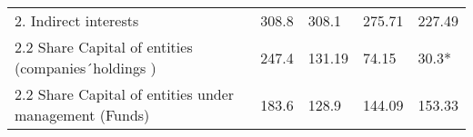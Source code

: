 \documentclass[]{book}
\theoremstyle{definition}
\theoremstyle{definition}
\theoremstyle{definition}
\theoremstyle{remark}
\begin{document}
\begin{longtable}[]{@{}lllll@{}}
\begin{minipage}[t]{0.17\columnwidth}\raggedright\strut
2. Indirect interests\strut
\end{minipage} & \begin{minipage}[t]{0.17\columnwidth}\raggedright\strut
308.8\strut
\end{minipage} & \begin{minipage}[t]{0.17\columnwidth}\raggedright\strut
308.1\strut
\end{minipage} & \begin{minipage}[t]{0.17\columnwidth}\raggedright\strut
275.71\strut
\end{minipage} & \begin{minipage}[t]{0.17\columnwidth}\raggedright\strut
227.49\strut
\end{minipage}\tabularnewline
\begin{minipage}[t]{0.17\columnwidth}\raggedright\strut
2.2 Share Capital of entities (companies´holdings )\strut
\end{minipage} & \begin{minipage}[t]{0.17\columnwidth}\raggedright\strut
247.4\strut
\end{minipage} & \begin{minipage}[t]{0.17\columnwidth}\raggedright\strut
131.19\strut
\end{minipage} & \begin{minipage}[t]{0.17\columnwidth}\raggedright\strut
74.15\strut
\end{minipage} & \begin{minipage}[t]{0.17\columnwidth}\raggedright\strut
30.3*\strut
\end{minipage}\tabularnewline
\begin{minipage}[t]{0.17\columnwidth}\raggedright\strut
2.2 Share Capital of entities under management (Funds)\strut
\end{minipage} & \begin{minipage}[t]{0.17\columnwidth}\raggedright\strut
183.6\strut
\end{minipage} & \begin{minipage}[t]{0.17\columnwidth}\raggedright\strut
128.9\strut
\end{minipage} & \begin{minipage}[t]{0.17\columnwidth}\raggedright\strut
144.09\strut
\end{minipage} & \begin{minipage}[t]{0.17\columnwidth}\raggedright\strut
153.33\strut
\end{minipage}\tabularnewline

\end{longtable}
\end{document}
